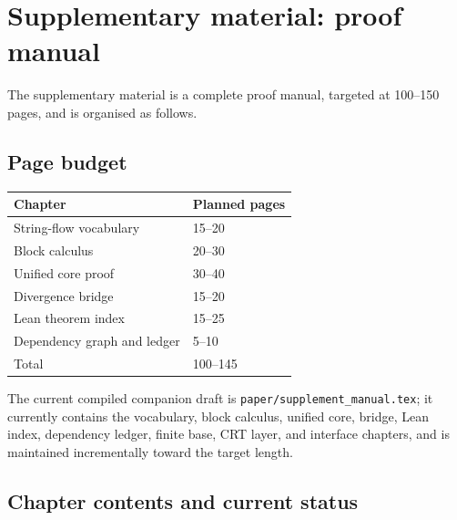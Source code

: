 \section{Supplementary material: proof manual}\label{sec:appendix}

The supplementary material is a complete proof manual, targeted at
100--150 pages, and is organised as follows.

\subsection{Page budget}

\begin{center}
\begin{tabular}{ll}
\toprule
Chapter & Planned pages \\
\midrule
String-flow vocabulary & 15--20 \\
Block calculus & 20--30 \\
Unified core proof & 30--40 \\
Divergence bridge & 15--20 \\
Lean theorem index & 15--25 \\
Dependency graph and ledger & 5--10 \\
\midrule
Total & 100--145 \\
\bottomrule
\end{tabular}
\end{center}

The current compiled companion draft is
\texttt{paper/supplement\_manual.tex}; it currently contains the
vocabulary, block calculus, unified core, bridge, Lean index,
dependency ledger, finite base, CRT layer, and interface chapters,
and is maintained incrementally toward the target length.

\subsection{Chapter contents and current status}

